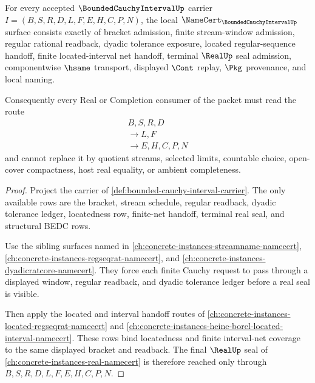 \begin{theorem}
\label{thm:bounded-cauchy-interval-namecert-obligations}
For every accepted $\BoundedCauchyIntervalUp$ carrier $I=(B,S,R,D,L,F,E,H,C,P,N)$, the local $\NameCert_{\BoundedCauchyIntervalUp}$ surface consists exactly of bracket admission, finite stream-window admission, regular rational readback, dyadic tolerance exposure, located regular-sequence handoff, finite located-interval net handoff, terminal $\RealUp$ seal admission, componentwise $\hsame$ transport, displayed $\Cont$ replay, $\Pkg$ provenance, and local naming.

Consequently every Real or Completion consumer of the packet must read the route
$$
\begin{gathered}
B,S,R,D\\
\longrightarrow L,F\\
\longrightarrow E,H,C,P,N
\end{gathered}
$$
and cannot replace it by quotient streams, selected limits, countable choice, open-cover compactness, host real equality, or ambient completeness.
\end{theorem}
\begin{proof}
Project the carrier of \autoref{def:bounded-cauchy-interval-carrier}. The only available rows are the bracket, stream schedule, regular readback, dyadic tolerance ledger, locatedness row, finite-net handoff, terminal real seal, and structural BEDC rows.

Use the sibling surfaces named in \autoref{ch:concrete-instances-streamname-namecert}, \autoref{ch:concrete-instances-regseqrat-namecert}, and \autoref{ch:concrete-instances-dyadicratcore-namecert}. They force each finite Cauchy request to pass through a displayed window, regular readback, and dyadic tolerance ledger before a real seal is visible.

Then apply the located and interval handoff routes of \autoref{ch:concrete-instances-located-regseqrat-namecert} and \autoref{ch:concrete-instances-heine-borel-located-interval-namecert}. These rows bind locatedness and finite interval-net coverage to the same displayed bracket and readback. The final $\RealUp$ seal of \autoref{ch:concrete-instances-real-namecert} is therefore reached only through $B,S,R,D,L,F,E,H,C,P,N$.
\end{proof}

